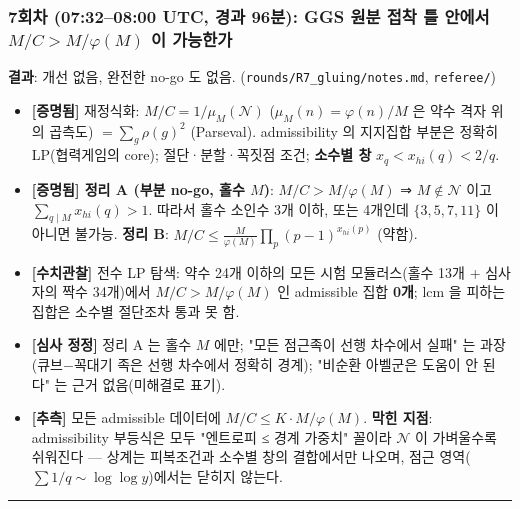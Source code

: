 \hypertarget{uxd68cuxcc28-07320800-utc-uxacbduxacfc-96uxbd84-ggs-uxc6d0uxbd84-uxc811uxcc29-uxd2c0-uxc548uxc5d0uxc11c-mcmvarphim-uxc774-uxac00uxb2a5uxd55cuxac00}{%
\subsubsection*{\texorpdfstring{7회차 (07:32--08:00 UTC, 경과 96분): GGS 원분 접착 틀 안에서 \(M/C>M/\varphi(M)\) 이 가능한가}{7회차 (07:32--08:00 UTC, 경과 96분): GGS 원분 접착 틀 안에서 M/C\textgreater M/\textbackslash varphi(M) 이 가능한가}}\label{uxd68cuxcc28-07320800-utc-uxacbduxacfc-96uxbd84-ggs-uxc6d0uxbd84-uxc811uxcc29-uxd2c0-uxc548uxc5d0uxc11c-mcmvarphim-uxc774-uxac00uxb2a5uxd55cuxac00}}

\textbf{결과}: 개선 없음, 완전한 no-go 도 없음. (\texttt{rounds/R7\_gluing/notes.md}, \texttt{referee/})

\begin{itemize}
\tightlist
\item
  \textbf{{[}증명됨{]}} 재정식화: \(M/C=1/\mu_M(\mathcal N)\) (\(\mu_M(n)=\varphi(n)/M\) 은 약수 격자 위의 곱측도) \(=\sum_g\rho(g)^2\) (Parseval). admissibility 의 지지집합 부분은 정확히 LP(협력게임의 core); 절단·분할·꼭짓점 조건; \textbf{소수별 창} \(x_q<x_{hi}(q)<2/q\).
\item
  \textbf{{[}증명됨{]} 정리 A (부분 no-go, 홀수 \(M\))}: \(M/C>M/\varphi(M)\) ⇒ \(M\notin\mathcal N\) 이고 \(\sum_{q\mid M}x_{hi}(q)>1\). 따라서 홀수 소인수 3개 이하, 또는 4개인데 \(\{3,5,7,11\}\) 이 아니면 불가능. \textbf{정리 B}: \(M/C\le\frac M{\varphi(M)}\prod_p(p-1)^{x_{hi}(p)}\) (약함).
\item
  \textbf{{[}수치관찰{]}} 전수 LP 탐색: 약수 24개 이하의 모든 시험 모듈러스(홀수 13개 + 심사자의 짝수 34개)에서 \(M/C>M/\varphi(M)\) 인 admissible 집합 \textbf{0개}; lcm 을 피하는 집합은 소수별 절단조차 통과 못 함.
\item
  \textbf{{[}심사 정정{]}} 정리 A 는 홀수 \(M\) 에만; "모든 점근족이 선행 차수에서 실패" 는 과장(큐브−꼭대기 족은 선행 차수에서 정확히 경계); "비순환 아벨군은 도움이 안 된다" 는 근거 없음(미해결로 표기).
\item
  \textbf{{[}추측{]}} 모든 admissible 데이터에 \(M/C\le K\cdot M/\varphi(M)\). \textbf{막힌 지점}: admissibility 부등식은 모두 "엔트로피 ≤ 경계 가중치" 꼴이라 \(\mathcal N\) 이 가벼울수록 쉬워진다 --- 상계는 피복조건과 소수별 창의 결합에서만 나오며, 점근 영역(\(\sum1/q\sim\log\log y\))에서는 닫히지 않는다.
\end{itemize}

\begin{center}\rule{0.5\linewidth}{0.5pt}\end{center}

